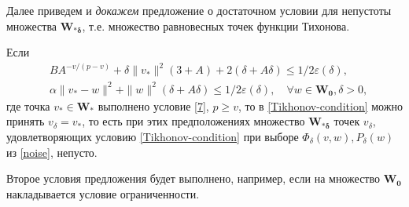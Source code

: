 Далее приведем и \textit{докажем} предложение о достаточном условии для непустоты множества $\mathbf{W_{*\delta}}$, т.е. множество равновесных точек функции Тихонова.
\begin{prop}
	\label{propsition-2}
	Если 
	\begin{equation}
	\label{13}
	\begin{aligned}
	&BA^{-v/(p-v)}+\delta\|v_*\|^2(3+A)+2(\delta+A\delta)\leqslant 1/2\varepsilon(\delta),\\ &\alpha\|v_*-w\|^2+\|w\|^2(\delta+A\delta)\leqslant 1/2 \varepsilon(\delta),\quad\forall w\in\mathbf{W_0},\delta>0,
	\end{aligned}
	\end{equation}
	где точка $v_*\in\mathbf{W_*}$ выполнено условие \eqref{7}, $p\geqslant v$, то в \eqref{Tikhonov-condition} можно принять $v_{\delta}=v_*$, то есть при этих предположениях множество $\mathbf{W_{*\delta}}$ точек $v_{\delta}$, удовлетворяющих условию \eqref{Tikhonov-condition} при выборе $\Phi_{\delta}(v,w),P_{\delta}(w)$ из \eqref{noise}, непусто.
\end{prop}
\begin{remark}
	Второе условия предложения будет выполнено, например, если на множество $\mathbf{W_0}$ накладывается условие ограниченности.
\end{remark}


